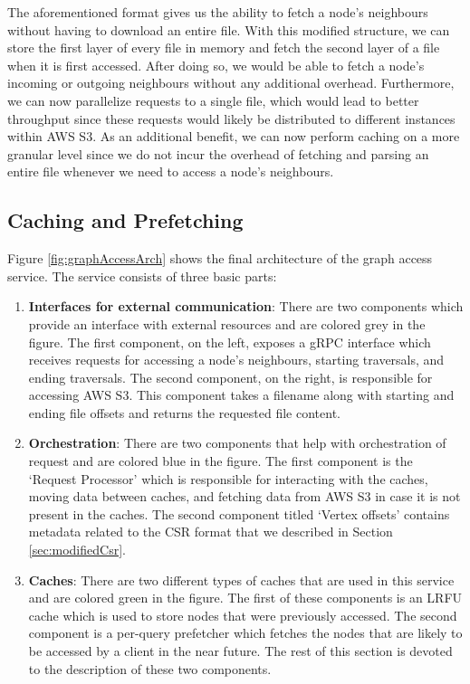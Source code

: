 \medskip
The aforementioned format gives us the ability to fetch a node's neighbours
without having to download an entire file. With this modified structure, we can
store the first layer of every file in memory and fetch the second layer of a
file when it is first accessed. After doing so, we would be able to fetch a
node's incoming or outgoing neighbours without any additional overhead.
Furthermore, we can now parallelize requests to a single file, which would lead
to better throughput since these requests would likely be distributed to
different instances within AWS S3. As an additional benefit, we can now perform
caching on a more granular level since we do not incur the overhead of fetching
and parsing an entire file whenever we need to access a node's neighbours.

\subsection{Caching and Prefetching}\label{sec:accessCachePrefetching}
Figure \ref{fig:graphAccessArch} shows the final architecture of the graph
access service. The service consists of three basic parts:
\begin{enumerate}
    \item \textbf{Interfaces for external communication}: There are two 
        components which provide an interface with external resources and are
        colored grey in the figure. The first component, on the left,
        exposes a gRPC interface which receives requests for accessing a node's
        neighbours, starting traversals, and ending traversals. The second
        component, on the right, is responsible for accessing AWS S3. This component
        takes a filename along with starting and ending file offsets and returns
        the requested file content.
    \item \textbf{Orchestration}: There are two components that help with
        orchestration of request and are colored blue in the figure. The first
        component is the `Request Processor' which is responsible for
        interacting with the caches, moving data between caches, and fetching
        data from AWS S3 in case it is not present in the caches. The second
        component titled `Vertex offsets' contains metadata related to the CSR
        format that we described in Section \ref{sec:modifiedCsr}.
    \item \textbf{Caches}: There are two different types of caches that are used
        in this service and are colored green in the figure. The first of these
        components is an LRFU cache which is used to store nodes that were
        previously accessed. The second component is a per-query prefetcher
        which fetches the nodes that are likely to be accessed by a client in
        the near future. The rest of this section is devoted to the description
        of these two components.
\end{enumerate}
